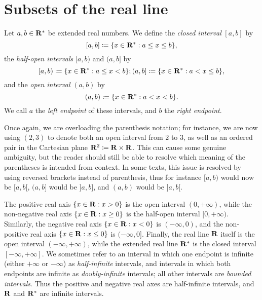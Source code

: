 \section{Subsets of the real line}\label{sec 9.1}

\begin{definition}[Intervals]\label{9.1.1}
    Let \(a, b \in \mathbf{R}^*\) be extended real numbers.
    We define the \emph{closed interval} \([a, b]\) by
    \[
        [a, b] \coloneqq \{x \in \mathbf{R}^* : a \leq x \leq b\},
    \]
    the \emph{half-open intervals} \([a, b)\) and \((a, b]\) by
    \[
        [a, b) \coloneqq \{x \in \mathbf{R}^* : a \leq x < b\}; (a, b] \coloneqq \{x \in \mathbf{R}^* : a < x \leq b\},
    \]
    and the \emph{open interval} \((a, b)\) by
    \[
        (a, b) \coloneqq \{x \in \mathbf{R}^* : a < x < b\}.
    \]
    We call \(a\) the \emph{left endpoint} of these intervals, and \(b\) the \emph{right endpoint}.
\end{definition}

\begin{remark}\label{9.1.2}
    Once again, we are overloading the parenthesis notation;
    for instance, we are now using \((2, 3)\) to denote both an open interval from \(2\) to \(3\), as well as an ordered pair in the Cartesian plane \(\mathbf{R}^2 \coloneqq \mathbf{R} \times \mathbf{R}\).
    This can cause some genuine ambiguity, but the reader should still be able to resolve which meaning of the parentheses is intended from context.
    In some texts, this issue is resolved by using reversed brackets instead of parenthesis, thus for instance \([a, b)\) would now be \([a, b[\), \((a, b]\) would be \(]a, b]\), and \((a, b)\) would be \(]a, b[\).
\end{remark}

\begin{example}\label{9.1.3}
    The positive real axis \(\{x \in \mathbf{R} : x > 0\}\) is the open interval \((0, +\infty)\), while the non-negative real axis \(\{x \in \mathbf{R} : x \geq 0\}\) is the half-open interval \([0, +\infty)\).
            Similarly, the negative real axis \(\{x \in \mathbf{R} : x < 0\}\) is \((-\infty, 0)\), and the non-positive real axis \(\{x \in \mathbf{R} : x \leq 0\}\) is \((-\infty, 0]\).
    Finally, the real line \(\mathbf{R}\) itself is the open interval \((-\infty, +\infty)\), while the extended real line \(\mathbf{R}^*\) is the closed interval \([-\infty, +\infty]\).
    We sometimes refer to an interval in which one endpoint is infinite (either \(+\infty\) or \(-\infty\)) as \emph{half-infinite} intervals, and intervals in which both endpoints are infinite as \emph{doubly-infinite} intervals;
    all other intervals are \emph{bounded intervals}.
    Thus the positive and negative real axes are half-infinite intervals, and \(\mathbf{R}\) and \(\mathbf{R}^*\) are infinite intervals.
\end{example}

